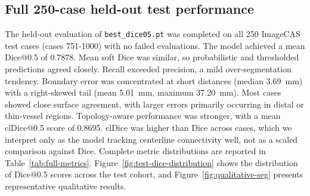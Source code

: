 \documentclass[anonymous]{iopjournal}
\begin{document}
\subsection{Full 250-case held-out test performance}

The held-out evaluation of \texttt{best\_dice05.pt} was completed on all 250 ImageCAS test cases (cases 751-1000) with no failed evaluations. The model achieved a mean Dice@0.5 of 0.7878. Mean soft Dice was similar, so probabilistic and thresholded predictions agreed closely. Recall exceeded precision, a mild over-segmentation tendency. Boundary error was concentrated at short distances (median \SI{3.69}{mm}) with a right-skewed tail (mean \SI{5.01}{mm}, maximum \SI{37.20}{mm}). Most cases showed close surface agreement, with larger errors primarily occurring in distal or thin-vessel regions. Topology-aware performance was stronger, with a mean clDice@0.5 score of 0.8695. clDice was higher than Dice across cases, which we interpret only as the model tracking centerline connectivity well, not as a scaled comparison against Dice. Complete metric distributions are reported in Table~\ref{tab:full-metrics}. Figure~\ref{fig:test-dice-distribution} shows the distribution of Dice@0.5 scores across the test cohort, and Figure~\ref{fig:qualitative-seg} presents representative qualitative results.
\end{document}
